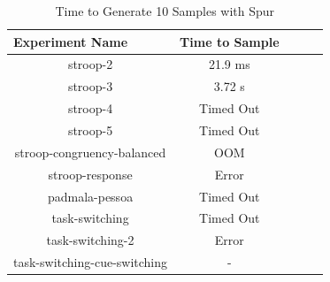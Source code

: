 




\begin{table}[b]
  \centering
  \caption{Time to Generate 10 Samples with Spur}
\begin{tabular}{|c|c|c|c|c|}
\hline
\multicolumn{1}{|l|}{Experiment Name} & Time to Sample                \\ \hline
stroop-2                              & 21.9 ms                       \\ \hline
stroop-3                              & 3.72 s                        \\ \hline
stroop-4                              & Timed Out                     \\ \hline
stroop-5                              & Timed Out                     \\ \hline
stroop-congruency-balanced            & OOM                           \\ \hline  %
stroop-response                       & Error                         \\ \hline  %
padmala-pessoa                        & Timed Out                     \\ \hline  %
task-switching                        & Timed Out                     \\ \hline  %
task-switching-2                      & Error                         \\ \hline  %
task-switching-cue-switching          & -                             \\ \hline  %
\end{tabular}
\label{tab:benchmark_experiments_spur}%
\end{table}

